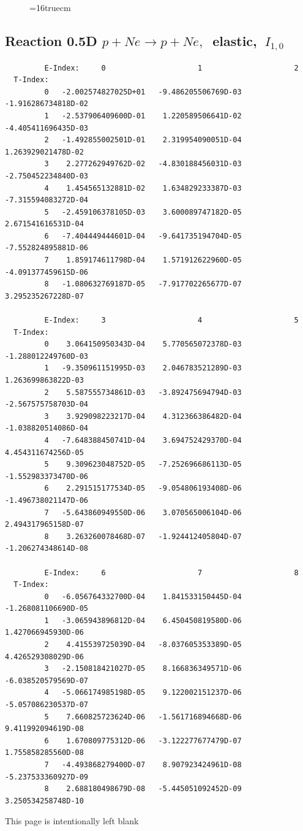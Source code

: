 \documentclass[12pt,dvips]{article}
\begin{document}
\begin{figure} \label{0.5T}
\epsfxsize=16truecm
\end{figure}
\newpage

\subsection{
Reaction 0.5D  $p + Ne \rightarrow p + Ne ,\ $
 elastic, $\  I_{1,0}$
}

\begin{small}\begin{verbatim}
         E-Index:     0                     1                     2
  T-Index:
         0   -2.002574827025D+01   -9.486205506769D-03   -1.916286734818D-02
         1   -2.537906409600D-01    1.220589506641D-02   -4.405411696435D-03
         2   -1.492855002501D-01    2.319954090051D-04    1.263929021478D-02
         3    2.277262949762D-02   -4.830188456031D-03   -2.750452234840D-03
         4    1.454565132881D-02    1.634829233387D-03   -7.315594083272D-04
         5   -2.459106378105D-03    3.600089747182D-05    2.671541616531D-04
         6   -7.404449444601D-04   -9.641735194704D-05   -7.552824895881D-06
         7    1.859174611798D-04    1.571912622960D-05   -4.091377459615D-06
         8   -1.080632769187D-05   -7.917702265677D-07    3.295235267228D-07

         E-Index:     3                     4                     5
  T-Index:
         0    3.064150950343D-04    5.770565072378D-03   -1.288012249760D-03
         1   -9.350961151995D-03    2.046783521289D-03    1.263699863822D-03
         2    5.587555734861D-03   -3.892475694794D-03   -2.567575758703D-04
         3    3.929098223217D-04    4.312366386482D-04   -1.038820514086D-04
         4   -7.648388450741D-04    3.694752429370D-04    4.454311674256D-05
         5    9.309623048752D-05   -7.252696686113D-05   -1.552983373470D-06
         6    2.291515177534D-05   -9.054806193408D-06   -1.496738021147D-06
         7   -5.643860949550D-06    3.070565006104D-06    2.494317965158D-07
         8    3.263260078468D-07   -1.924412405804D-07   -1.206274348614D-08

         E-Index:     6                     7                     8
  T-Index:
         0   -6.056764332700D-04    1.841533150445D-04   -1.268081106690D-05
         1   -3.065943896812D-04    6.450450819580D-06    1.427066945930D-06
         2    4.415539725039D-04   -8.037605353389D-05    4.426529308029D-06
         3   -2.150818421027D-05    8.166836349571D-06   -6.038520579569D-07
         4   -5.066174985198D-05    9.122002151237D-06   -5.057086230537D-07
         5    7.660825723624D-06   -1.561716894668D-06    9.411992094619D-08
         6    1.670809775312D-06   -3.122277677479D-07    1.755858285560D-08
         7   -4.493868279400D-07    8.907923424961D-08   -5.237533360927D-09
         8    2.688180498679D-08   -5.445051092452D-09    3.250534258748D-10

\end{verbatim}\end{small}
\newpage
This page is intentionally left blank
\newpage
\end{document}
